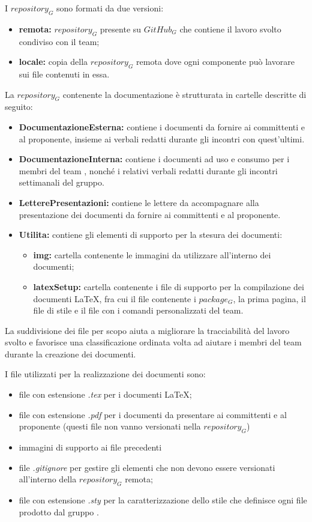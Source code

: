 I $repository_G$ sono formati da due versioni:
\begin{itemize}
	\item \textbf{remota:} $repository_G$ presente su $GitHub_G$ che contiene il lavoro svolto condiviso con il team;
	\item \textbf{locale:} copia della $repository_G$ remota dove ogni componente può lavorare sui file contenuti in essa.
\end{itemize}

La $repository_G$ contenente la documentazione è strutturata in cartelle descritte di seguito:
\begin{itemize}
 \item \textbf{DocumentazioneEsterna:} contiene i documenti da fornire ai committenti e al proponente, insieme ai verbali redatti durante gli incontri con quest'ultimi.
\item \textbf{DocumentazioneInterna:} contiene i documenti ad uso e consumo per i membri del team \Omicron, nonché i relativi verbali redatti durante gli incontri settimanali del gruppo.
\item \textbf{LetterePresentazioni:} contiene le lettere da accompagnare alla presentazione dei documenti da fornire ai committenti e al proponente.
\item \textbf{Utilita:} contiene gli elementi di supporto per la stesura dei documenti:
\begin{itemize}
	\item \textbf{img:} cartella contenente le immagini da utilizzare all'interno dei documenti;
	\item \textbf{latexSetup: } cartella contenente i file di supporto per la compilazione dei documenti \LaTeX, fra cui il file contenente i $package_G$, la prima pagina, il file di stile e il file con i comandi personalizzati del team.
\end{itemize}
\end{itemize}
La suddivisione dei file per scopo aiuta a migliorare la tracciabilità del lavoro svolto e favorisce una classificazione ordinata volta ad aiutare i membri del team durante la creazione dei documenti.


I file utilizzati per la realizzazione dei documenti sono:
\begin{itemize}
	\item file con estensione \textit{.tex} per i documenti \LaTeX;
	\item file con estensione \textit{.pdf} per i documenti da presentare ai committenti e al proponente (questi file non vanno versionati nella $repository_G$)
	\item immagini di supporto ai file precedenti
	\item file \textit{.gitignore} per gestire gli elementi che non devono essere versionati all'interno della $repository_G$ remota;
	\item file con estensione \textit{.sty} per la caratterizzazione dello stile che definisce ogni file prodotto dal gruppo \Omicron.
\end{itemize}

